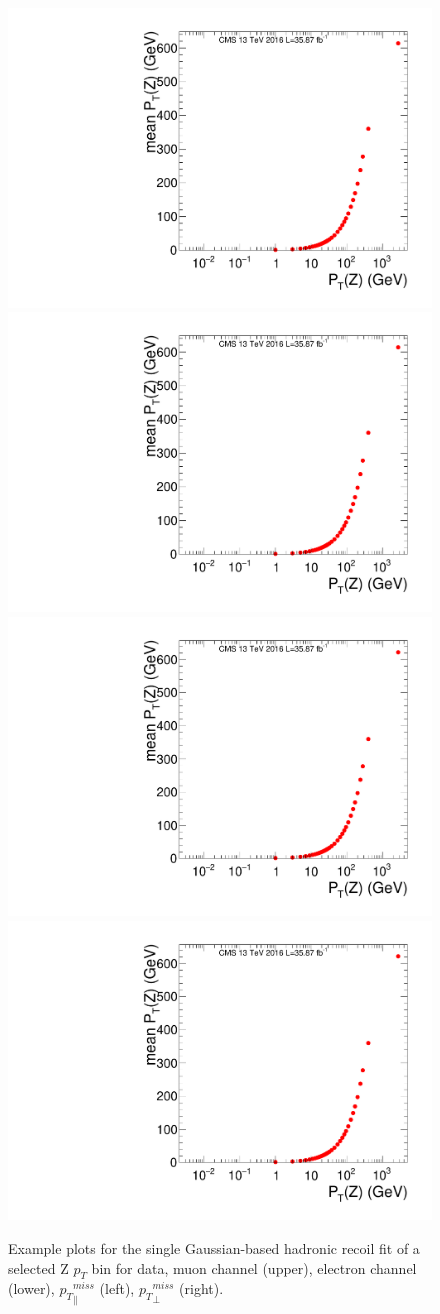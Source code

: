 \begin{figure}[htbp]
\begin{center}
\includegraphics[width=0.46\linewidth, page=21]{figures/SingleEMU_Run2016Full_03Feb2017_allcorV2_met_para_study_ZSelecLowLPt_mu.pdf}
\includegraphics[width=0.46\linewidth, page=56]{figures/SingleEMU_Run2016Full_03Feb2017_allcorV2_met_para_study_ZSelecLowLPt_mu.pdf}
\includegraphics[width=0.46\linewidth, page=21]{figures/SingleEMU_Run2016Full_03Feb2017_allcorV2_met_para_study_ZSelecLowLPt_el.pdf}
\includegraphics[width=0.46\linewidth, page=56]{figures/SingleEMU_Run2016Full_03Feb2017_allcorV2_met_para_study_ZSelecLowLPt_el.pdf}
\caption{Example plots for the single Gaussian-based \ptmiss hadronic recoil fit of a selected Z $p_T$ bin for \Zjets data, muon channel (upper), electron channel (lower), ${p_{T}}^{miss}_\parallel$ (left), ${p_{T}}^{miss}_\perp$ (right).}
\label{fig:recoilfit_example_data}
\end{center}
\end{figure}


